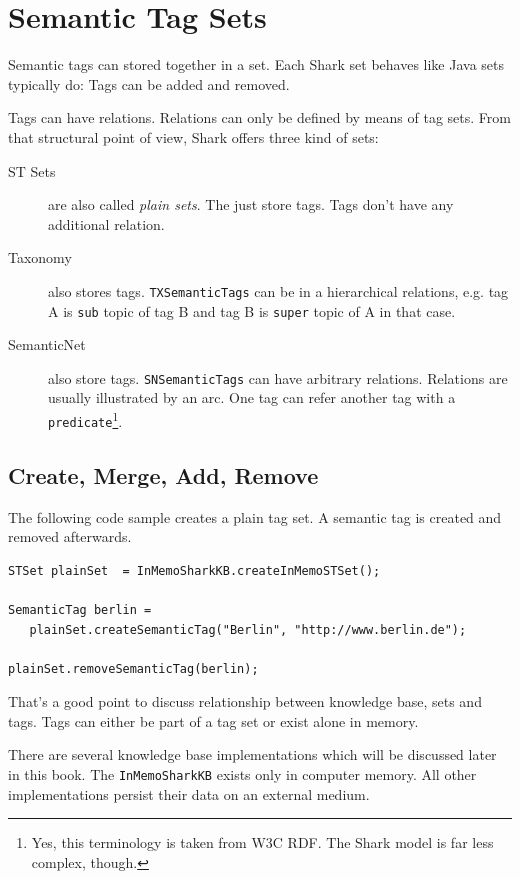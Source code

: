 \chapter{Semantic Tag Sets}
Semantic tags can stored together in a set. Each Shark set behaves like Java sets typically do: Tags can be added and removed. 

Tags can have relations. Relations can only be defined by means of tag 
sets. From that structural point of view, Shark offers three kind of sets:

\begin{description}
\item[ST Sets] are also called {\it plain sets}. The just store tags. Tags don't have any additional relation.
\item[Taxonomy] also stores tags. {\tt TXSemanticTags} can be in a hierarchical 
relations, e.g. tag A is {\tt sub} topic of tag B and tag B is {\tt super} topic of A in that case.
\item[SemanticNet] also store tags. {\tt SNSemanticTags} can have arbitrary relations. Relations are usually illustrated by an arc. One tag can refer another tag with a {\tt predicate}\footnote{Yes, this terminology is taken from W3C RDF. The Shark model is far less complex, though.}.
\end{description}

\section{Create, Merge, Add, Remove}
The following code sample creates a plain tag set. A semantic tag is created and removed afterwards.

\begin{verbatim}
STSet plainSet  = InMemoSharkKB.createInMemoSTSet();

SemanticTag berlin = 
   plainSet.createSemanticTag("Berlin", "http://www.berlin.de");

plainSet.removeSemanticTag(berlin);
\end{verbatim}

That's a good point to discuss relationship between knowledge base, sets and 
tags. Tags can either be part of a tag set or exist alone in memory.

There are several knowledge base implementations which will be discussed later in this book. The {\verb|InMemoSharkKB|} exists only in computer memory. All other implementations persist their data on an external medium.

